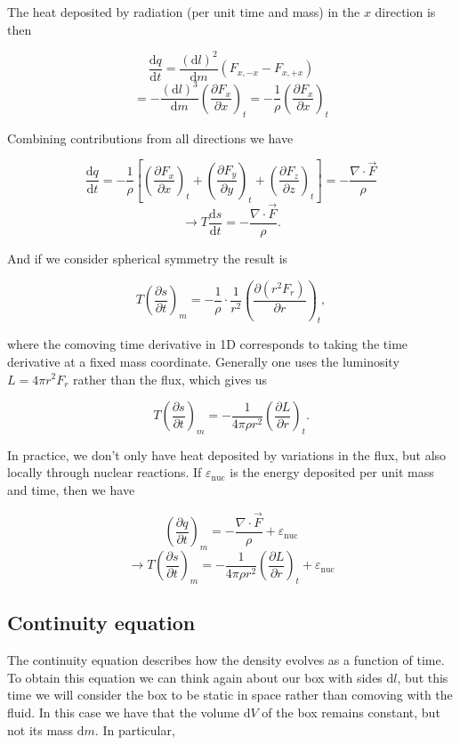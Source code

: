 \documentclass[twocolumn]{article}
\begin{document}
The heat deposited by radiation (per unit time and mass) in the \(x\)
direction is then

\[\frac{\mathrm{d} q}{\mathrm{d} t}=\frac{(\mathrm{d}l)^2}{\mathrm{d}m}\left(F_{x,-x}-F_{x,+x}\right)\]
\[=-\frac{(\mathrm{d}l)^3}{\mathrm{d}m}\left(\frac{\partial F_x}{\partial x}\right)_t=-\frac{1}{\rho}\left(\frac{\partial F_x}{\partial x}\right)_t\]

Combining contributions from all directions we have

\[\frac{\mathrm{d} q}{\mathrm{d} t}=-\frac{1}{\rho}\left[\left(\frac{\partial F_x}{\partial x}\right)_t+\left(\frac{\partial F_y}{\partial y}\right)_t + \left(\frac{\partial F_z}{\partial z}\right)_t\right]=-\frac{\nabla\cdot \vec{F}}{\rho}\]
\[\rightarrow T\frac{\mathrm{d} s}{\mathrm{d} t} = -\frac{\nabla\cdot \vec{F}}{\rho}.\]

And if we consider spherical symmetry the result is

\[T\left(\frac{\partial s}{\partial t}\right)_m=-\frac{1}{\rho}\cdot\frac{1}{r^2}\left(\frac{\partial(r^2 F_r)}{\partial r}\right)_t,\]

where the comoving time derivative in 1D corresponds to taking the time
derivative at a fixed mass coordinate. Generally one uses the luminosity
\(L=4\pi r^2 F_r\) rather than the flux, which gives us

\[T\left(\frac{\partial s}{\partial t}\right)_m=-\frac{1}{4\pi \rho r^2}\left(\frac{\partial L}{\partial r}\right)_t.\]

In practice, we don't only have heat deposited by variations in the
flux, but also locally through nuclear reactions. If
\(\varepsilon_\mathrm{nuc}\) is the energy deposited per unit mass and
time, then we have

\[\left(\frac{\partial q}{\partial t}\right)_m=-\frac{\nabla \cdot \vec{F}}{\rho}+\varepsilon_\mathrm{nuc}\]
\[\rightarrow \boxed{T\left(\frac{\partial s}{\partial t}\right)_m=-\frac{1}{4\pi \rho r^2}\left(\frac{\partial L}{\partial r}\right)_t + \varepsilon_\mathrm{nuc}}\]

\hypertarget{continuity-equation}{%
\subsection{Continuity equation}\label{continuity-equation}}

The continuity equation describes how the density evolves as a function
of time. To obtain this equation we can think again about our box with
sides \(\mathrm{d}l\), but this time we will consider the box to be
static in space rather than comoving with the fluid. In this case we
have that the volume \(\mathrm{d}V\) of the box remains constant, but
not its mass \(\mathrm{d}m\). In particular,
\end{document}
